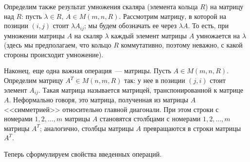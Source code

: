 Определим также результат умножения скаляра (элемента кольца $R$) на
матрицу над $R$: пусть $\lambda\in R$, $A\in M(m,n,R)$. Рассмотрим
матрицу, в которой на позиции $(i,j)$ стоит $\lambda A_{ij}$; мы будем
обозначать ее через $\lambda A$. То есть, при умножении матрицы $A$ на
скаляр $\lambda$ каждый элемент матрицы $A$ умножается на $\lambda$
(здесь мы предполагаем, что кольцо $R$ коммутативно, поэтому неважно,
с какой стороны происходит умножение).

Наконец, еще одна важная операция~---
матрицы. Пусть $A\in M(m,n,R)$. Определим матрицу $A^T\in M(n,m,R)$
так: у нее в позиции $(j,i)$ стоит элемент $A_{ij}$. Такая матрица
называется матрицей, транспонированной к матрице $A$. Неформально
говоря, это матрица, полученная из матрицы $A$ <<симметрией>>
относительно главной диагонали. При этом строки с номерами
$1,2,\dots,m$ матрицы $A$ становятся столбцами с номерами
$1,2,\dots,m$ матрицы $A^T$; аналогично, столбцы матрицы $A$
превращаются в строки матрицы $A^T$.

Теперь сформулируем свойства введенных операций.

